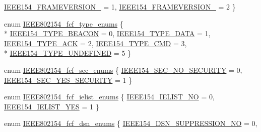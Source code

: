 \begin{DoxyCompactItemize}
\hyperlink{group___i_e_e_e802154_gga9cc0df2fa38563eb499e46cb7aecafd2a04fc5e9bda064e5800dce30971f57263}{I\+E\+E\+E154\+\_\+\+F\+R\+A\+M\+E\+V\+E\+R\+S\+I\+O\+N\+\_} = 1, 
\hyperlink{group___i_e_e_e802154_gga9cc0df2fa38563eb499e46cb7aecafd2a2385401a779cf550c55330c9a26efcb9}{I\+E\+E\+E154\+\_\+\+F\+R\+A\+M\+E\+V\+E\+R\+S\+I\+O\+N\+\_} = 2
 \}
\item 
enum \hyperlink{group___i_e_e_e802154_gacdd1804c2ab2885a6df255751de45fb1}{I\+E\+E\+E802154\+\_\+fcf\+\_\+type\+\_\+enums} \{ \\*
\hyperlink{group___i_e_e_e802154_ggacdd1804c2ab2885a6df255751de45fb1a658c8cf3896ca7e43699ade7b1e52192}{I\+E\+E\+E154\+\_\+\+T\+Y\+P\+E\+\_\+\+B\+E\+A\+C\+ON} = 0, 
\hyperlink{group___i_e_e_e802154_ggacdd1804c2ab2885a6df255751de45fb1a18f9d0fd8b22b2562cdf8da1e4a208cc}{I\+E\+E\+E154\+\_\+\+T\+Y\+P\+E\+\_\+\+D\+A\+TA} = 1, 
\hyperlink{group___i_e_e_e802154_ggacdd1804c2ab2885a6df255751de45fb1a0ad3b0497db6c08868a1b32eefa04120}{I\+E\+E\+E154\+\_\+\+T\+Y\+P\+E\+\_\+\+A\+CK} = 2, 
\hyperlink{group___i_e_e_e802154_ggacdd1804c2ab2885a6df255751de45fb1a61fa0a037043b3e63bcf19a42352c85e}{I\+E\+E\+E154\+\_\+\+T\+Y\+P\+E\+\_\+\+C\+MD} = 3, 
\\*
\hyperlink{group___i_e_e_e802154_ggacdd1804c2ab2885a6df255751de45fb1a4d924c28069e102c439a4f2d2813d46e}{I\+E\+E\+E154\+\_\+\+T\+Y\+P\+E\+\_\+\+U\+N\+D\+E\+F\+I\+N\+ED} = 5
 \}
\item 
enum \hyperlink{group___i_e_e_e802154_ga586538cb7a250d41827bd2a65dc90ec3}{I\+E\+E\+E802154\+\_\+fcf\+\_\+sec\+\_\+enums} \{ \hyperlink{group___i_e_e_e802154_gga586538cb7a250d41827bd2a65dc90ec3ad5688baf2ab312209dea86a3ca97a184}{I\+E\+E\+E154\+\_\+\+S\+E\+C\+\_\+\+N\+O\+\_\+\+S\+E\+C\+U\+R\+I\+TY} = 0, 
\hyperlink{group___i_e_e_e802154_gga586538cb7a250d41827bd2a65dc90ec3aa4db638fc78d5d61c97c1c6444913d8f}{I\+E\+E\+E154\+\_\+\+S\+E\+C\+\_\+\+Y\+E\+S\+\_\+\+S\+E\+C\+U\+R\+I\+TY} = 1
 \}
\item 
enum \hyperlink{group___i_e_e_e802154_ga0329e1b5e23a7f1020e06abc52ee5669}{I\+E\+E\+E802154\+\_\+fcf\+\_\+ielist\+\_\+enums} \{ \hyperlink{group___i_e_e_e802154_gga0329e1b5e23a7f1020e06abc52ee5669a80bdaca7ee8aa93be6888e1be58f54e7}{I\+E\+E\+E154\+\_\+\+I\+E\+L\+I\+S\+T\+\_\+\+NO} = 0, 
\hyperlink{group___i_e_e_e802154_gga0329e1b5e23a7f1020e06abc52ee5669a64aa01f6a0a5967f9f4fd7e52f964b9a}{I\+E\+E\+E154\+\_\+\+I\+E\+L\+I\+S\+T\+\_\+\+Y\+ES} = 1
 \}
\item 
enum \hyperlink{group___i_e_e_e802154_gaec0a87fb4c8f6028b4b45819bf28c488}{I\+E\+E\+E802154\+\_\+fcf\+\_\+dsn\+\_\+enums} \{ \hyperlink{group___i_e_e_e802154_ggaec0a87fb4c8f6028b4b45819bf28c488a5888840c03f3d5ba34d65ef506e58ae4}{I\+E\+E\+E154\+\_\+\+D\+S\+N\+\_\+\+S\+U\+P\+P\+R\+E\+S\+S\+I\+O\+N\+\_\+\+NO} = 0, 

\end{DoxyCompactItemize}
